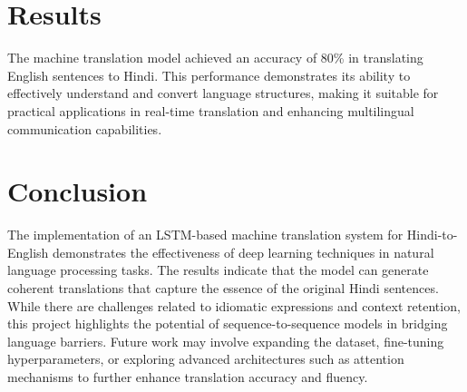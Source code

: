 \documentclass{article}
\begin{document}

\section{Results}
The machine translation model achieved an accuracy of 80\% in translating English sentences to Hindi. This performance demonstrates its ability to effectively understand and convert language structures, making it suitable for practical applications in real-time translation and enhancing multilingual communication capabilities.


\section{Conclusion}

The implementation of an LSTM-based machine translation system for Hindi-to-English demonstrates the effectiveness of deep learning techniques in natural language processing tasks. The results indicate that the model can generate coherent translations that capture the essence of the original Hindi sentences. While there are challenges related to idiomatic expressions and context retention, this project highlights the potential of sequence-to-sequence models in bridging language barriers. Future work may involve expanding the dataset, fine-tuning hyperparameters, or exploring advanced architectures such as attention mechanisms to further enhance translation accuracy and fluency.
\end{document}
